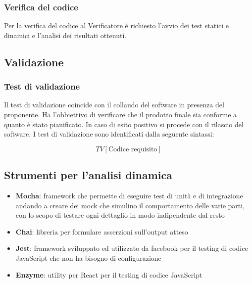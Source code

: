 \subsubsection{Verifica del codice} 
Per la verifica del codice al Verificatore è richiesto l’avvio dei test statici e dinamici e l’analisi dei risultati ottenuti.


\subsection{Validazione}

\subsubsection{Test di validazione}
Il test di validazione coincide con il collaudo del software in
presenza del proponente. Ha l’obbiettivo di verificare che il prodotto finale sia conforme a quanto è stato pianificato. In caso di esito positivo si procede con il
rilascio del software. I test di validazione sono identificati dalla
seguente sintassi: 

$$ TV[\text{Codice requisito}] $$


\subsection{Strumenti per l'analisi dinamica}

\begin{itemize}
	\item \textbf{Mocha}: framework che permette di eseguire test di unità e di integrazione andando a creare dei mock che simulino il comportamento delle varie parti, con lo scopo di testare ogni dettaglio in modo indipendente dal resto
	\item \textbf{Chai}: libreria per formulare asserzioni sull'output atteso
	\item \textbf{Jest}: framework sviluppato ed utilizzato da facebook per il testing di codice JavaScript che non ha bisogno di configurazione
	\item \textbf{Enzyme}: utility per React per il testing di codice JavaScript
\end{itemize}

